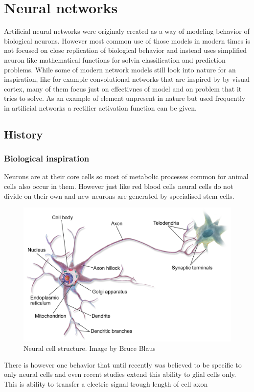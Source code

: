 \chapter{Neural networks}
Artificial neural networks were originaly created as a way of modeling behavior of biological
neurons. However most common use of those models in modern times is not focused on close
replication of biological behavior and instead uses simplified neuron like mathematical 
functions for solvin classification and prediction problems.
While some of modern network models still look into nature for an inspiration, like for example
convolutional networks that are inspired by by visual cortex, many of them focus just on 
effectivnes of model and on problem that it tries to solve.
As an example of element unpresent in nature but used frequently in artificial networks a 
rectifier activation function can be given.

\section{History}

\subsection{Biological inspiration}
Neurons are at their core cells so most of metabolic processes common for animal cells also
occur in them. However just like red blood cells neural cells do not divide on their own and new
neurons are generated by specialised stem cells.
\begin{figure}[ht]
	\includegraphics[width=\textwidth]{res/Blausen_MultipolarNeuron}
	\caption{Neural cell structure. Image by Bruce Blaus}
	\label{fig:Blausen-Neuron}
\end{figure}
There is however one behavior that until recently was believed to be specific to only neural cells
and even recent studies extend this ability to glial cells only.
This is ability to transfer a electric signal trough length of cell axon 

